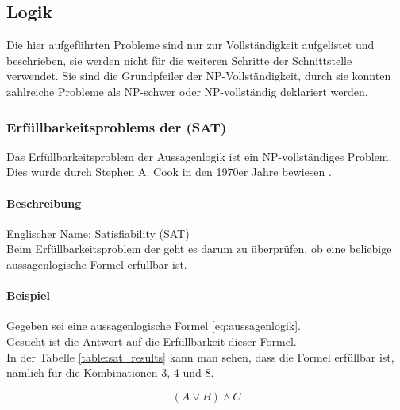 \newpage
\subsection{Logik}\label{logic}
Die hier aufgeführten Probleme sind nur zur Vollständigkeit aufgelistet und beschrieben, sie werden nicht für die weiteren Schritte der Schnittstelle verwendet. Sie sind die Grundpfeiler der NP-Vollständigkeit, durch sie konnten zahlreiche Probleme als NP-schwer oder NP-vollständig deklariert werden.

	\subsubsection{Erfüllbarkeitsproblems der  (SAT)}\label{sat}
	Das Erfüllbarkeitsproblem der Aussagenlogik ist ein NP-vollständiges Problem. Dies wurde durch Stephen A. Cook in den 1970er Jahre bewiesen \cite{cook_complexity}.

	\paragraph{Beschreibung}
	Englischer Name: Satisfiability (SAT)\\
	Beim Erfüllbarkeitsproblem der  geht es darum zu überprüfen, ob eine beliebige aussagenlogische Formel erfüllbar ist.	

	\paragraph{Beispiel} Gegeben sei eine aussagenlogische Formel \ref{eq:aussagenlogik}.\\
	Gesucht ist die Antwort auf die Erfüllbarkeit dieser Formel.\\
	In der Tabelle \ref{table:sat_results} kann man sehen, dass die Formel erfüllbar ist, nämlich für die Kombinationen 3, 4 und 8.

	\begin{equation}
   		(A \vee B) \wedge C
  		 \label{eq:aussagenlogik}
	\end{equation}

